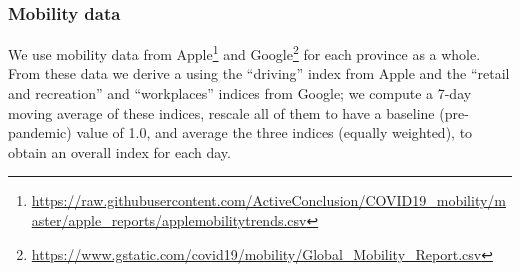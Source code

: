 \documentclass[12pt]{article}\usepackage[]{graphicx}\usepackage[]{color}
\begin{document}
\hypertarget{Mobility data}{}
\subsubsection*{Mobility data}

We use mobility data from
Apple\footnote{\url{https://raw.githubusercontent.com/ActiveConclusion/COVID19_mobility/master/apple_reports/applemobilitytrends.csv}}
and
Google\footnote{\url{https://www.gstatic.com/covid19/mobility/Global_Mobility_Report.csv}}
for each province as a whole. From these data we derive a
 using the ``driving'' index from Apple
and the ``retail and recreation'' and ``workplaces'' indices from
Google; we compute a 7-day moving average of these indices, rescale
all of them to have a baseline (pre-pandemic) value of 1.0, and
average the three indices (equally weighted), to obtain an overall
index for each day.
\end{document}
